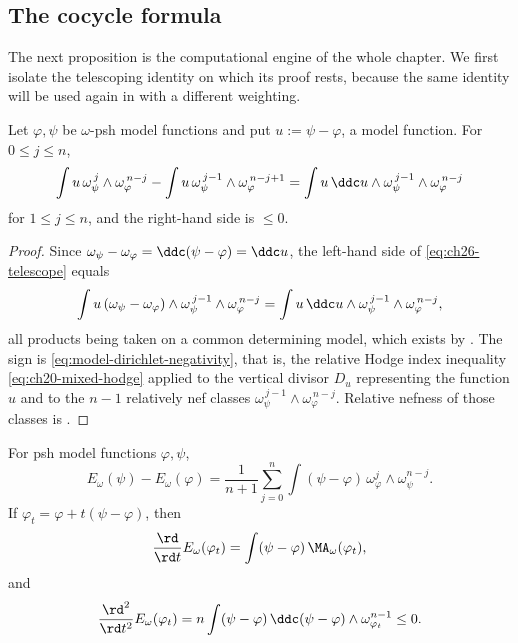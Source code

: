 \subsection{The cocycle formula}
\label{sec:ch26-cocycle}

The next proposition is the computational engine of the whole chapter.  We
first isolate the telescoping identity on which its proof rests, because the
same identity will be used again in  with a different
weighting.

\begin{lemma}
\label{lem:ch26-telescope}
Let $\varphi,\psi$ be $\omega$-psh model functions and put
$u:=\psi-\varphi$, a model function.  For $0\leq j\leq n$,
\begin{equation}
\label{eq:ch26-telescope}
 \int u\,\omega_\psi^{\,j}\wedge\omega_\varphi^{\,n-j}
 -\int u\,\omega_\psi^{\,j-1}\wedge\omega_\varphi^{\,n-j+1}
 =\int u\,\ddc u\wedge
   \omega_\psi^{\,j-1}\wedge\omega_\varphi^{\,n-j}
\end{equation}
for $1\leq j\leq n$, and the right-hand side is $\leq0$.
\end{lemma}

\begin{proof}
Since $\omega_\psi-\omega_\varphi=\ddc(\psi-\varphi)=\ddc u$, the left-hand
side of \eqref{eq:ch26-telescope} equals
\[
 \int u\,(\omega_\psi-\omega_\varphi)\wedge
   \omega_\psi^{\,j-1}\wedge\omega_\varphi^{\,n-j}
 =\int u\,\ddc u\wedge
   \omega_\psi^{\,j-1}\wedge\omega_\varphi^{\,n-j},
\]
all products being taken on a common determining model, which exists by
.  The sign is
\eqref{eq:model-dirichlet-negativity}, that is, the relative Hodge index
inequality \eqref{eq:ch20-mixed-hodge} applied to the vertical divisor
$D_u$ representing the function $u$ and to the $n-1$ relatively nef classes
$\omega_\psi^{\,j-1}\wedge\omega_\varphi^{\,n-j}$.  Relative nefness of
those classes is .
\end{proof}

\begin{proposition}\label{prop:energy-cocycle}
For psh model functions $\varphi,\psi$,
\begin{equation}
\label{eq:energy-cocycle}
 E_\omega(\psi)-E_\omega(\varphi)
 =\frac1{n+1}\sum_{j=0}^n
  \int(\psi-\varphi)\,
  \omega_\varphi^j\wedge\omega_\psi^{n-j}.
\end{equation}
If $\varphi_t=\varphi+t(\psi-\varphi)$, then
\begin{equation}
\label{eq:energy-first-variation}
 \frac{\rd}{\rd t}E_\omega(\varphi_t)
 =\int(\psi-\varphi)\,\MA_\omega(\varphi_t),
\end{equation}
and
\begin{equation}
\label{eq:energy-second-variation}
 \frac{\rd^2}{\rd t^2}E_\omega(\varphi_t)
 =n\int(\psi-\varphi)\,\ddc(\psi-\varphi)
       \wedge\omega_{\varphi_t}^{n-1}\leq0.
\end{equation}
\end{proposition}

